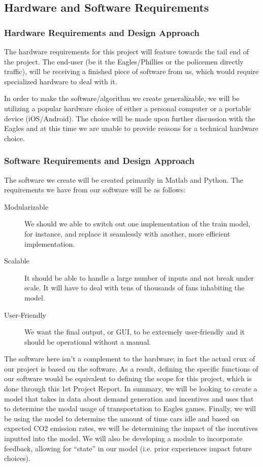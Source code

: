 \documentclass[draft,12pt,titlepage]{article}
\begin{document}
\subsection{Hardware and Software Requirements}
\subsubsection{Hardware Requirements and Design Approach}
The hardware requirements for this project will feature towards the tail end of the project.
The end-user (be it the Eagles/Phillies or the policemen directly traffic), will be receiving a
finished piece of software from us, which would require specialized hardware to deal with it.

In order to make the software/algorithm we create generalizable, we will be utilizing a
popular hardware choice of either a personal computer or a portable device (iOS/Android). The choice will be made upon further discussion with the Eagles and at this time we are
unable to provide reasons for a technical hardware choice.

\subsubsection{ Software Requirements and Design Approach}
The software we create will be created primarily in Matlab and Python. The requirements we
have from our software will be as follows:

\begin{description}
  \item[Modularizable] \hfill We should we able to switch out one implementation of the train model, for instance, and replace it seamlessly with another, more efficient implementation.
  \item[Scalable] \hfill It should be able to handle a large number of inputs and not break under scale. It will have to deal with tens of thousands of fans inhabiting the model.
  \item[User-Friendly] \hfill We want the final output, or GUI, to be extremely user-friendly and it should be operational without a manual.
\end{description}

The software here isn’t a complement to the hardware; in fact the actual crux of our project is
based on the software. As a result, defining the specific functions of our software would be
equivalent to defining the scope for this project, which is done through this 1st Project Report.
In summary, we will be looking to create a model that takes in data about demand generation
and incentives and uses that to determine the modal usage of transportation to Eagles games.
Finally, we will be using the model to determine the amount of time cars idle and based on
expected CO2 emission rates, we will be determining the impact of the incentives inputted
into the model. We will also be developing a module to incorporate feedback, allowing for
``state'' in our model (i.e. prior experiences impact future choices).
\end{document}
